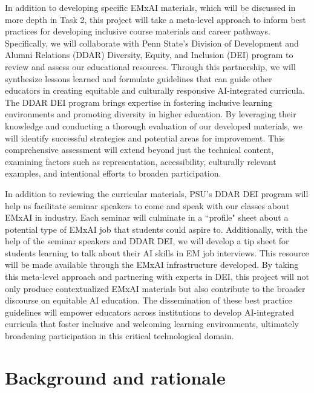\documentclass[11pt]{article}
\begin{document}
In addition to developing specific EMxAI materials, which will be discussed in more depth in Task 2, this project will take a meta-level approach to inform best practices for developing inclusive course materials and career pathways. Specifically, we will collaborate with Penn State's Division of Development and Alumni Relations (DDAR) Diversity, Equity, and Inclusion (DEI) program to review and assess our educational resources. Through this partnership, we will synthesize lessons learned and formulate guidelines that can guide other educators in creating equitable and culturally responsive AI-integrated curricula.
The DDAR DEI program brings expertise in fostering inclusive learning environments and promoting diversity in higher education. By leveraging their knowledge and conducting a thorough evaluation of our developed materials, we will identify successful strategies and potential areas for improvement. This comprehensive assessment will extend beyond just the technical content, examining factors such as representation, accessibility, culturally relevant examples, and intentional efforts to broaden participation.

In addition to reviewing the curricular materials, PSU's DDAR DEI program will help us facilitate seminar speakers to come and speak with our classes about EMxAI in industry. Each seminar will culminate in a ``profile" sheet about a potential type of EMxAI job that students could aspire to. Additionally, with the help of the seminar speakers and DDAR DEI, we will develop a tip sheet for students learning to talk about their AI skills in EM job interviews. This resource will be made available through the EMxAI infrastructure developed.
By taking this meta-level approach and partnering with experts in DEI, this project will not only produce contextualized EMxAI materials but also contribute to the broader discourse on equitable AI education. The dissemination of these best practice guidelines will empower educators across institutions to develop AI-integrated curricula that foster inclusive and welcoming learning environments, ultimately broadening participation in this critical technological domain.

\section{Background and rationale}
\end{document}
